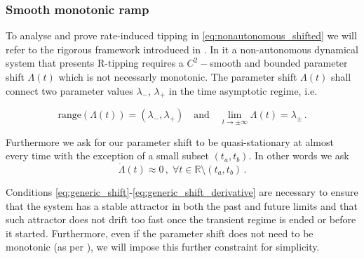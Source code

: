\documentclass[../main.tex]{subfiles}
\begin{document}
\subsubsection{Smooth monotonic ramp}\label{subsubsec:ramp}

To analyse and prove rate-induced tipping in \eqref{eq:nonautonomous_shifted} we will refer to the rigorous framework introduced in \cite{Ashwin17}.
In it a non-autonomous dynamical system that presents R-tipping requires a $C^{2}-$smooth and bounded parameter shift $\Lambda(t)$ which is not necessarly monotonic.
The parameter shift $\Lambda(t)$ shall connect two parameter values $\lambda_{-},\,\lambda_{+}$ in the time asymptotic regime, i.e.

\begin{equation}\label{eq:generic_shift}
     \text{range}(\Lambda(t))=(\lambda_{-},\lambda_{+})\quad \text{and}\quad \lim_{t\to\pm\infty}\Lambda(t)=\lambda_{\pm}\,.
\end{equation}

Furthermore we ask for our parameter shift to be quasi-stationary at almost every time with the exception of a small subset $(t_{a},t_{b})$.
In other words we ask
\begin{equation}\label{eq:generic_shift_derivative}
        \dot{\Lambda}(t) \approx 0\,,\;\forall t\in \mathbb{R}\setminus(t_{a},t_{b})\,. 
\end{equation}

Conditions \eqref{eq:generic_shift}-\eqref{eq:generic_shift_derivative} are necessary to ensure that the system has a stable attractor in both the past and future limits and that such attractor does not drift too fast once the transient regime is ended or before it started.
Furthermore, even if the parameter shift does not need to be monotonic (as per \cite{Ashwin17}), we will impose this further constraint for simplicity.
\end{document}
